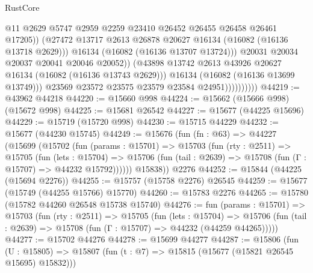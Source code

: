 \begin{lexlean}{RustCore}
\begin{coremodule}
                                    @11
                                    @2629
                                    @5747
                                    @2959
                                    @2259
                                    @23410
                                    @26452
                                    @26455
                                    @26458
                                    @26461
                                    @17205))
                                (@27472
                                  @13717
                                  @2613
                                  @26878
                                  @20627
                                  @16134
                                  (@16082 (@16136 @13718 @2629)))
                                @16134
                                (@16082 (@16136 @13707 @13724)))
                              @20031
                              @20034
                              @20037
                              @20041
                              @20046
                              @20052))
                          (@43898 @13742 @2613 @43926 @20627 @16134 (@16082 (@16136 @13743 @2629)))
                          @16134
                          (@16082 (@16136 @13699 @13749)))
                        @23569
                        @23572
                        @23575
                        @23579
                        @23584
                        @24951))))))))))
@44219 := @43962 @44218
@44220 := @15660 @998
@44224 := @15662 (@15666 @998) (@15672 @998)
@44225 := @15681 @26542
@44227 := @15677 (@44225 @15696)
@44229 := @15719 (@15720 @998)
@44230 := @15715 @44229
@44232 := @15677 (@44230 @15745)
@44249 := @15676
    (fun (fn : @63) =>
    @44227
      (@15699
        (@15702
          (fun (params : @15701) =>
          @15703
            (fun (rty : @2511) =>
            @15705
              (fun (lets : @15704) =>
              @15706 (fun (tail : @2639) => @15708 (fun (Γ : @15707) => @44232 @15792))))))
        @15838))
    @2276
@44252 := @15844 (@44225 (@15694 @2276))
@44255 := @15757 (@15758 @2276) @26545
@44259 := @15677 (@15749 (@44255 @15766) @15770)
@44260 := @15783 @2276
@44265 := @15780 (@15782 @44260 @26548 @15738 @15740)
@44276 := fun (params : @15701) =>
  @15703
    (fun (rty : @2511) =>
    @15705
      (fun (lets : @15704) =>
      @15706 (fun (tail : @2639) => @15708 (fun (Γ : @15707) => @44232 (@44259 @44265)))))
@44277 := @15702 @44276
@44278 := @15699 @44277
@44287 := @15806
    (fun (U : @15805) => @15807 (fun (t : @7) => @15815 (@15677 (@15821 @26545 @15695) @15832)))

\end{coremodule}
\end{lexlean}
